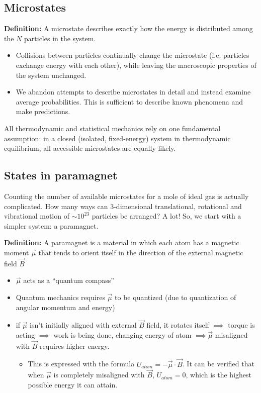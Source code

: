 \documentclass[11pt]{article}
\begin{document}
\subsection{Microstates}
\textbf{Definition:} A microstate describes exactly how the energy is distributed among the $N$ particles in the system.
\begin{itemize}
    \item Collisions between particles continually change the microstate (i.e. particles exchange energy with each other), while leaving the macroscopic properties of the system unchanged. 
    \item We abandon attempts to describe microstates in detail and instead examine average probabilities. This is sufficient to describe known phenomena and make predictions. 
\end{itemize}

All thermodynamic and statistical mechanics rely on one fundamental assumption: in a closed (isolated, fixed-energy) system in thermodynamic equilibrium, all accessible microstates are equally likely. 

\subsection{States in paramagnet}
Counting the number of available microstates for a mole of ideal gas is actually complicated. How many ways can 3-dimensional translational, rotational and vibrational motion of $\sim10^{23}$ particles be arranged? A lot! So, we start with a simpler system: a paramagnet. 

\textbf{Definition:} A paramagnet is a material in which each atom has a magnetic moment $\Vec{\mu}$ that tends to orient itself in the direction of the external magnetic field $\Vec{B}$
\begin{itemize}
    \item $\Vec{\mu}$ acts as a ``quantum compass''
    \item Quantum mechanics requires $\Vec{\mu}$ to be quantized (due to quantization of angular momentum and energy)
    \item if $\Vec{\mu}$ isn't initially aligned with external $\Vec{B}$ field, it rotates itself $\implies$ torque is acting $\implies$ work is being done, changing energy of atom $\implies \Vec{\mu}$ misaligned with $\Vec{B}$ requires higher energy. 
    \begin{itemize}
        \item This is expressed with the formula $U_{atom} = - \Vec{\mu} \cdot \Vec{B}$. It can be verified that when $\Vec{\mu}$ is completely misaligned with $\Vec{B}$, $U_{atom} = 0$, which is the highest possible energy it can attain. 
    \end{itemize}
\end{itemize}
\end{document}
